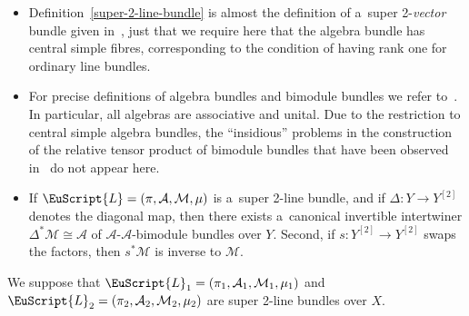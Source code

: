 \documentclass[10pt,a4paper]{amsart}
\numberwithin{equation}{section}
\def\mathscr#1{\EuScript{#1}}
\begin{document}
\begin{Remark}\quad
\begin{itemize}\itemsep=0pt
\item
Definition~\ref{super-2-line-bundle} is almost the definition of a~super 2-\emph{vector} bundle given in~\cite{Kristel2020}, just that we require here that the algebra bundle has central simple fibres, corresponding to the condition of having rank one for ordinary line bundles.
\item
For precise definitions of algebra bundles and bimodule bundles we refer to~\cite{Kristel2022}. In particular, all algebras are associative and unital. Due to the restriction to central simple algebra bundles, the ``insidious'' problems in the construction of the relative tensor product of bimodule bundles that have been observed in~\cite{Kristel2022} do not appear here.

\item
If $\mathscr{L}=(\pi,\mathcal{A},\mathcal{M},\mu)$ is a~super 2-line bundle, and if $\Delta\colon Y \to Y^{[2]}$ denotes the diagonal map, then there exists a~canonical invertible intertwiner $\Delta^{*}\mathcal{M} \cong \mathcal{A}$ of $\mathcal{A}$-$\mathcal{A}$-bimodule bundles over $Y$. Second, if $s\colon Y^{[2]} \to Y^{[2]}$ swaps the factors, then $s^{*}\mathcal{M}$ is inverse to $\mathcal{M}$.


\end{itemize}
\end{Remark}
We suppose that $\mathscr{L}_1=(\pi_1,\mathcal{A}_1,\mathcal{M}_1,\mu_1)$ and $\mathscr{L}_2=(\pi_2,\mathcal{A}_2,\mathcal{M}_2,\mu_2)$ are super 2-line bundles over $X$.
\end{document}
